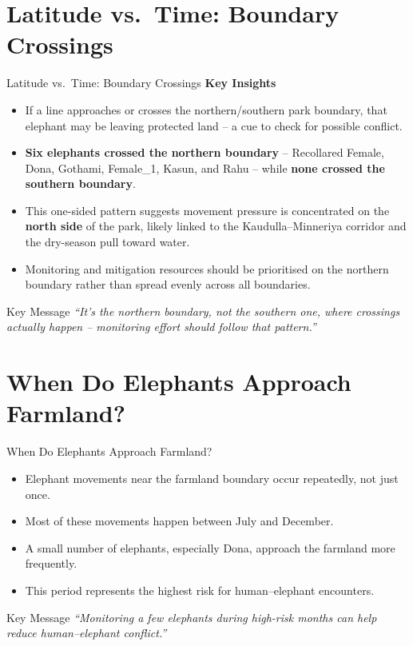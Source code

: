 \documentclass{beamer}
\begin{document}
	
	

	\section{Latitude vs.\ Time: Boundary Crossings}
	\begin{frame}{Latitude vs.\ Time: Boundary Crossings}
		\textbf{Key Insights}
		\footnotesize
		\begin{itemize}
			\item If a line approaches or crosses the northern/southern park boundary, that elephant may be leaving protected land -- a cue to check for possible conflict.
			\item \textbf{Six elephants crossed the northern boundary} -- Recollared Female, Dona, Gothami, Female\_1, Kasun, and Rahu -- while \textbf{none crossed the southern boundary}.
			\item This one-sided pattern suggests movement pressure is concentrated on the \textbf{north side} of the park, likely linked to the Kaudulla--Minneriya corridor and the dry-season pull toward water.
			\item Monitoring and mitigation resources should be prioritised on the northern boundary rather than spread evenly across all boundaries.
		\end{itemize}
		
		\vspace{0.4cm}
		\begin{block}{Key Message}
			\textit{``It's the northern boundary, not the southern one, where crossings actually happen -- monitoring effort should follow that pattern.''}
		\end{block}
	\end{frame}
	
	
	
	
	\section{When Do Elephants Approach Farmland?}
	\begin{frame}{When Do Elephants Approach Farmland?}
		\normalsize
		\begin{itemize}
			\item Elephant movements near the farmland boundary occur repeatedly, not just once.
			\item Most of these movements happen between July and December.
			\item A small number of elephants, especially Dona, approach the farmland more frequently.
			\item This period represents the highest risk for human--elephant encounters.
		\end{itemize}
		
		\vspace{0.5cm}
		\begin{block}{Key Message}
			\textit{``Monitoring a few elephants during high-risk months can help reduce human--elephant conflict.''}
		\end{block}
	\end{frame}
	
\end{document}
